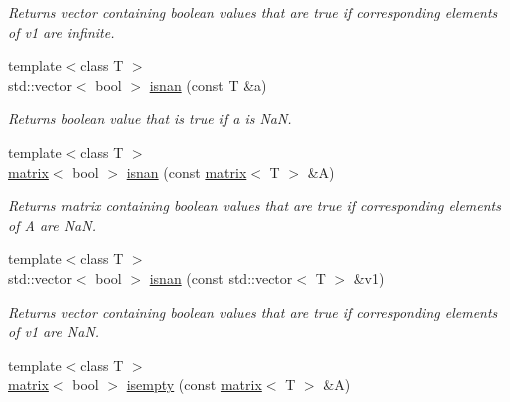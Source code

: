 \begin{DoxyCompactItemize}
\begin{DoxyCompactList}\small\item\em Returns vector containing boolean values that are true if corresponding elements of v1 are infinite. \end{DoxyCompactList}\item 
\hypertarget{namespacekeycpp_a6b5311cd26b6819f68c158d08c39d501}{{\footnotesize template$<$class T $>$ }\\std\-::vector$<$ bool $>$ \hyperlink{namespacekeycpp_a6b5311cd26b6819f68c158d08c39d501}{isnan} (const T \&a)}\label{namespacekeycpp_a6b5311cd26b6819f68c158d08c39d501}

\begin{DoxyCompactList}\small\item\em Returns boolean value that is true if a is Na\-N. \end{DoxyCompactList}\item 
\hypertarget{namespacekeycpp_ad3b16064066dc041be364e6fbefa173a}{{\footnotesize template$<$class T $>$ }\\\hyperlink{classkeycpp_1_1matrix}{matrix}$<$ bool $>$ \hyperlink{namespacekeycpp_ad3b16064066dc041be364e6fbefa173a}{isnan} (const \hyperlink{classkeycpp_1_1matrix}{matrix}$<$ T $>$ \&A)}\label{namespacekeycpp_ad3b16064066dc041be364e6fbefa173a}

\begin{DoxyCompactList}\small\item\em Returns matrix containing boolean values that are true if corresponding elements of A are Na\-N. \end{DoxyCompactList}\item 
\hypertarget{namespacekeycpp_a00160cff29da446de425d98ffafe8cb3}{{\footnotesize template$<$class T $>$ }\\std\-::vector$<$ bool $>$ \hyperlink{namespacekeycpp_a00160cff29da446de425d98ffafe8cb3}{isnan} (const std\-::vector$<$ T $>$ \&v1)}\label{namespacekeycpp_a00160cff29da446de425d98ffafe8cb3}

\begin{DoxyCompactList}\small\item\em Returns vector containing boolean values that are true if corresponding elements of v1 are Na\-N. \end{DoxyCompactList}\item 
\hypertarget{namespacekeycpp_acc2de8926c54a2048a0d8965e7d70995}{{\footnotesize template$<$class T $>$ }\\\hyperlink{classkeycpp_1_1matrix}{matrix}$<$ bool $>$ \hyperlink{namespacekeycpp_acc2de8926c54a2048a0d8965e7d70995}{isempty} (const \hyperlink{classkeycpp_1_1matrix}{matrix}$<$ T $>$ \&A)}\label{namespacekeycpp_acc2de8926c54a2048a0d8965e7d70995}


\end{DoxyCompactItemize}
